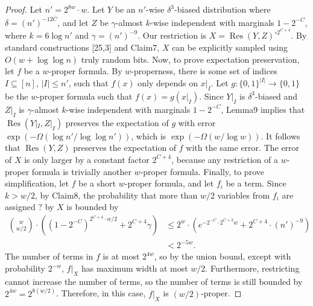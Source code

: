 \documentclass[10pt,a4paper]{article}
\begin{document}
\begin{proof}
Let $n'=2^{8w}\cdot w$. Let $Y$ be an $n'$-wise $\delta^3$-biased distribution where $\delta=(n')^{-12\bar C}$, and let $Z$ be $\gamma$-almost $k$-wise independent with marginals $1-2^{-C}$, where $k=6\log n'$ and $\gamma=(n')^{-9}$. Our restriction is $X=\operatorname{Res}(Y,Z)^{\circ2^{C+4}}$.
By standard constructions [25,3] and Claim7, $X$ can be explicitly sampled using $O(w+\log\log n)$ truly random bits.
Now, to prove expectation preservation, let $f$ be a $w$-proper formula. By $w$-properness, there is some set of indices $I\subseteq[n]$, $|I|\le n'$, such that $f(x)$ only depends on $x|_I$. Let $g:\{0,1\}^{|I|}\to\{0,1\}$ be the $w$-proper formula such that $f(x)=g(x|_I)$. Since $Y|_I$ is $\delta^3$-biased and $Z|_I$ is $\gamma$-almost $k$-wise independent with marginals $1-2^{-C}$, Lemma9 implies that $\operatorname{Res}(Y|_I,Z|_I)$ preserves the expectation of $g$ with error $\exp(-\Omega(\log n'/\log\log n'))$, which is $\exp(-\Omega(w/\log w))$. It follows that $\operatorname{Res}(Y,Z)$ preserves the expectation of $f$ with the same error. The error of $X$ is only larger by a constant factor $2^{C+4}$, because any restriction of a $w$-proper formula is trivially another $w$-proper formula.
Finally, to prove simplification, let $f$ be a short $w$-proper formula, and let $f_i$ be a term. Since $k>w/2$, by Claim8, the probability that more than $w/2$ variables from $f_i$ are assigned ? by $X$ is bounded by
\begin{align*}
\binom w{w/2}\cdot((1-2^{-C})^{2^{C+4}\cdot w/2}+2^{C+4}\gamma)
&\le2^w\cdot(e^{-2^{-C}\cdot2^{C+3}w}+2^{C+4}\cdot(n')^{-9})\\
&<2^{-5w}.
\end{align*}
The number of terms in $f$ is at most $2^{4w}$, so by the union bound, except with probability $2^{-w}$, $f|_X$ has maximum width at most $w/2$. Furthermore, restricting cannot increase the number of terms, so the number of terms is still bounded by $2^{4w}=2^{8(w/2)}$. Therefore, in this case, $f|_X$ is $(w/2)$-proper.
\end{proof}
\end{document}
